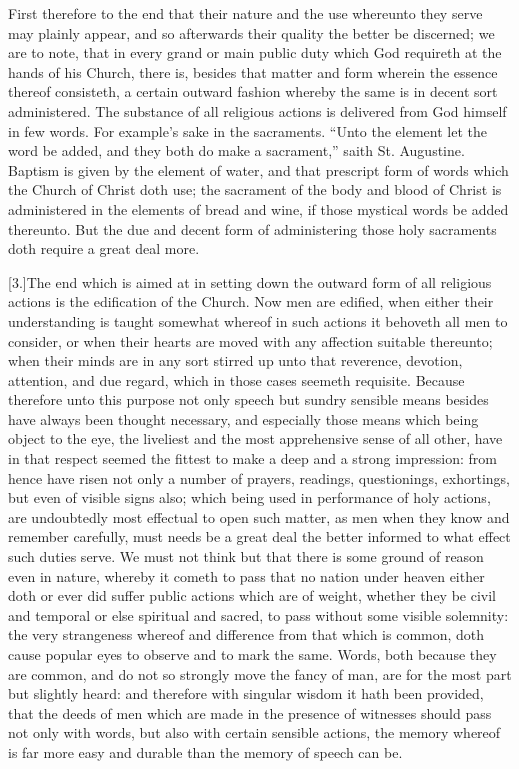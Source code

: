 First therefore to the end that their nature and the use whereunto they serve may plainly appear, and so afterwards their quality the better be discerned; we are to note, that in every grand or main public duty which God requireth at the  hands of his Church, there is, besides that matter and form wherein the essence thereof consisteth, a certain outward fashion whereby the same is in decent sort administered. The substance of all religious actions is delivered from God himself in few words. For example’s sake in the sacraments. “Unto the element let the word be added, and they both do make a sacrament,” saith St. Augustine. Baptism is given by the element of water, and that prescript form of words which the Church of Christ doth use; the sacrament of the body and blood of Christ is administered in the elements of bread and wine, if those mystical words be added thereunto. But the due and decent form of administering those holy sacraments doth require a great deal more.

[3.]The end which is aimed at in setting down the outward form of all religious actions is the edification of the Church. Now men are edified, when either their understanding is taught somewhat whereof in such actions it behoveth all men to consider, or when their hearts are moved with any affection suitable thereunto; when their minds are in any sort stirred up unto that reverence, devotion, attention, and due regard, which in those cases seemeth requisite. Because therefore unto this purpose not only speech but sundry sensible means besides have always been thought necessary, and especially those means which being object to the eye, the liveliest and the most apprehensive sense of all other, have in that respect seemed the fittest to make a deep and a strong impression: from hence have risen not only a number of prayers, readings, questionings, exhortings, but even of visible signs also; which being used in performance of holy actions, are undoubtedly most effectual to open such matter, as men when they know and remember carefully, must needs be a great deal the better informed to what effect such duties serve. We must not think but that there is some ground of reason even in nature, whereby it cometh to pass that no nation under heaven either doth or ever did suffer public actions  which are of weight, whether they be civil and temporal or else spiritual and sacred, to pass without some visible solemnity: the very strangeness whereof and difference from that which is common, doth cause popular eyes to observe and to mark the same. Words, both because they are common, and do not so strongly move the fancy of man, are for the most part but slightly heard: and therefore with singular wisdom it hath been provided, that the deeds of men which are made in the presence of witnesses should pass not only with words, but also with certain sensible actions, the memory whereof is far more easy and durable than the memory of speech can be.

